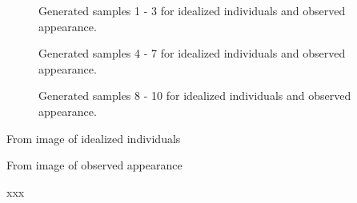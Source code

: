 \documentclass[11pt]{article}
\begin{document}
\begin{question}


		\begin{figure}[H]
			\center
			\caption{Generated samples 1 - 3 for idealized individuals and observed appearance.}
			\label{fig:samples}
		\end{figure}

		\begin{figure}[H]
			\center
			\caption{Generated samples 4 - 7 for idealized individuals and observed appearance.}
			\label{fig:samples}
		\end{figure}

		\begin{figure}[H]
			\center
			\caption{Generated samples 8 - 10 for idealized individuals and observed appearance.}
			\label{fig:samples}
		\end{figure}
\end{question}


\begin{question}


	\begin{subquestion}{From image of idealized individuals}
			\answer{
			}		  
	\end{subquestion}

	\begin{subquestion}{From image of observed appearance}
		\answer{
		}		  
	\end{subquestion}
\end{question}


\begin{question}


	\begin{subquestion}{xxx}
			\answer{
			}		  
	\end{subquestion}

\end{question}

\end{document}
